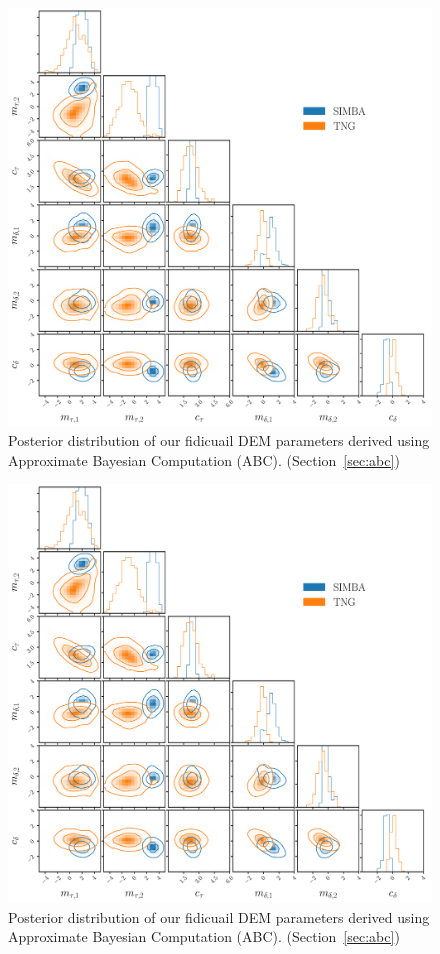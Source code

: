 \begin{figure}
\begin{center}
    \includegraphics[width=\textwidth]{figs/abc.pdf}
    \caption{Posterior distribution of our fidicuail DEM parameters derived
    using Approximate Bayesian Computation (ABC). (Section~\ref{sec:abc})}
\label{fig:abc}
\end{center}
\end{figure}

\begin{figure}
\begin{center}
    \includegraphics[width=\textwidth]{figs/abc.pdf}
    \caption{Posterior distribution of our fidicuail DEM parameters derived
    using Approximate Bayesian Computation (ABC). (Section~\ref{sec:abc})}
\label{fig:abc_nonslab}
\end{center}
\end{figure}

